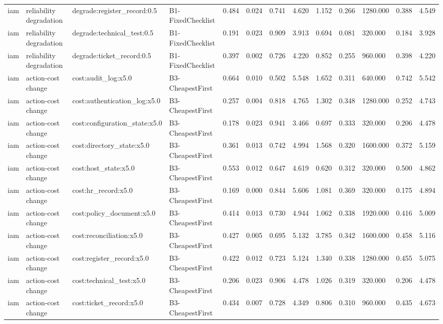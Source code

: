 \begin{table}[!ht]
{\begin{tabular}{lllllllllllll}
iam & reliability degradation & degrade:register\_record:0.5 & B1-FixedChecklist & 0.484 & 0.024 & 0.741 & 4.620 & 1.152 & 0.266 & 1280.000 & 0.388 & 4.549 \\
iam & reliability degradation & degrade:technical\_test:0.5 & B1-FixedChecklist & 0.191 & 0.023 & 0.909 & 3.913 & 0.694 & 0.081 & 320.000 & 0.184 & 3.928 \\
iam & reliability degradation & degrade:ticket\_record:0.5 & B1-FixedChecklist & 0.397 & 0.002 & 0.726 & 4.220 & 0.852 & 0.255 & 960.000 & 0.398 & 4.220 \\
iam & action-cost change & cost:audit\_log:x5.0 & B3-CheapestFirst & 0.664 & 0.010 & 0.502 & 5.548 & 1.652 & 0.311 & 640.000 & 0.742 & 5.542 \\
iam & action-cost change & cost:authentication\_log:x5.0 & B3-CheapestFirst & 0.257 & 0.004 & 0.818 & 4.765 & 1.302 & 0.348 & 1280.000 & 0.252 & 4.743 \\
iam & action-cost change & cost:configuration\_state:x5.0 & B3-CheapestFirst & 0.178 & 0.023 & 0.941 & 3.466 & 0.697 & 0.333 & 320.000 & 0.206 & 4.478 \\
iam & action-cost change & cost:directory\_state:x5.0 & B3-CheapestFirst & 0.361 & 0.013 & 0.742 & 4.994 & 1.568 & 0.320 & 1600.000 & 0.372 & 5.159 \\
iam & action-cost change & cost:host\_state:x5.0 & B3-CheapestFirst & 0.553 & 0.012 & 0.647 & 4.619 & 0.620 & 0.312 & 320.000 & 0.500 & 4.862 \\
iam & action-cost change & cost:hr\_record:x5.0 & B3-CheapestFirst & 0.169 & 0.000 & 0.844 & 5.606 & 1.081 & 0.369 & 320.000 & 0.175 & 4.894 \\
iam & action-cost change & cost:policy\_document:x5.0 & B3-CheapestFirst & 0.414 & 0.013 & 0.730 & 4.944 & 1.062 & 0.338 & 1920.000 & 0.416 & 5.009 \\
iam & action-cost change & cost:reconciliation:x5.0 & B3-CheapestFirst & 0.427 & 0.005 & 0.695 & 5.132 & 3.785 & 0.342 & 1600.000 & 0.458 & 5.116 \\
iam & action-cost change & cost:register\_record:x5.0 & B3-CheapestFirst & 0.422 & 0.012 & 0.723 & 5.124 & 1.340 & 0.338 & 1280.000 & 0.455 & 5.075 \\
iam & action-cost change & cost:technical\_test:x5.0 & B3-CheapestFirst & 0.206 & 0.023 & 0.906 & 4.478 & 1.026 & 0.319 & 320.000 & 0.206 & 4.478 \\
iam & action-cost change & cost:ticket\_record:x5.0 & B3-CheapestFirst & 0.434 & 0.007 & 0.728 & 4.349 & 0.806 & 0.310 & 960.000 & 0.435 & 4.673 \\

\end{tabular}}
\end{table}
